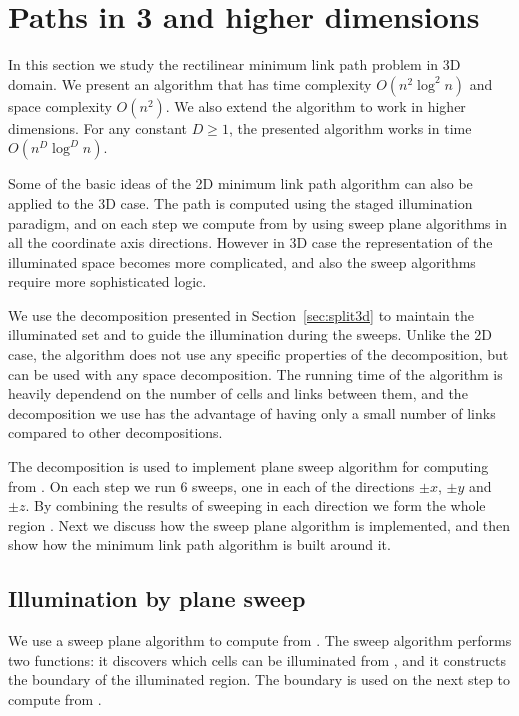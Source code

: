 \documentclass[english,gradu]{tktltiki2018}
\begin{document}
\section{Paths in 3 and higher dimensions}\label{sec:minlink3d}

In this section we study the rectilinear minimum link path problem in 3D domain.
We present an algorithm that has time complexity $O(n^2\log^2n)$ and space complexity $O(n^2)$.
We also extend the algorithm to work in higher dimensions.
For any constant $D\ge 1$, the presented algorithm works in time $O(n^D\log^Dn)$.

Some of the basic ideas of the 2D minimum link path algorithm can also be applied to the 3D case.
The path is computed using the staged illumination paradigm, and on each step we compute  from  by using sweep plane algorithms in all the coordinate axis directions.
However in 3D case the representation of the illuminated space becomes more complicated, and also the sweep algorithms require more sophisticated logic.

We use the decomposition presented in Section~\ref{sec:split3d} to maintain the illuminated set and to guide the illumination during the sweeps.
Unlike the 2D case, the algorithm does not use any specific properties of the decomposition, but can be used with any space decomposition.
The running time of the algorithm is heavily dependend on the number of cells and links between them, and the decomposition we use has the advantage of having only a small number of links compared to other decompositions.

The decomposition is used to implement plane sweep algorithm for computing  from .
On each step we run 6 sweeps, one in each of the directions $\pm x$, $\pm y$ and $\pm z$.
By combining the results of sweeping in each direction we form the whole region .
Next we discuss how the sweep plane algorithm is implemented, and then show how the minimum link path algorithm is built around it.

\subsection{Illumination by plane sweep}

We use a sweep plane algorithm to compute  from .
The sweep algorithm performs two functions: it discovers which cells can be illuminated from , and it constructs the boundary of the illuminated region.
The boundary is used on the next step to compute  from .
\end{document}
